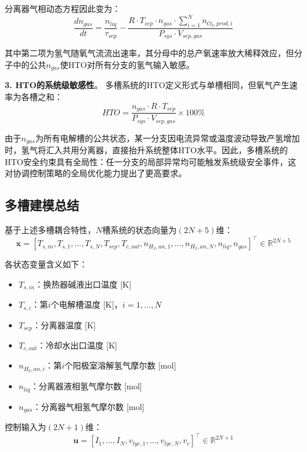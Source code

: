 分离器气相动态方程因此变为：
\begin{equation}
  \frac{dn_{gas}}{dt} = \frac{n_{liq}}{\tau_{sep}} - \frac{R \cdot T_{sep} \cdot n_{gas} \cdot \sum_{i=1}^{N} \dot{n}_{O_2,prod,i}}{P_{sys} \cdot V_{sep,gas}}
\end{equation}

其中第二项为氢气随氧气流流出速率，其分母中的总产氧速率放大稀释效应，但分子中的公共$n_{gas}$使HTO对所有分支的氢气输入敏感。

\textbf{3. HTO的系统级敏感性}。
多槽系统的HTO定义形式与单槽相同，但氧气产生速率为各槽之和：
\begin{equation}
  HTO = \frac{n_{gas} \cdot R \cdot T_{sep}}{P_{sys} \cdot V_{sep,gas}} \times 100\%
\end{equation}

由于$n_{gas}$为所有电解槽的公共状态，某一分支因电流异常或温度波动导致产氢增加时，氢气将汇入共用分离器，直接抬升系统整体HTO水平。因此，多槽系统的HTO安全约束具有全局性：任一分支的局部异常均可能触发系统级安全事件，这对协调控制策略的全局优化能力提出了更高要求。

\subsection{多槽建模总结}

基于上述多槽耦合特性，$N$槽系统的状态向量为$(2N+5)$维：
\begin{equation}
  \mathbf{x} = [T_{s,in}, T_{s,1}, \ldots, T_{s,N}, T_{sep}, T_{c,out}, n_{H_2,an,1}, \ldots, n_{H_2,an,N}, n_{liq}, n_{gas}]^\top \in \mathbb{R}^{2N+5}
\end{equation}

各状态变量含义如下：
\begin{itemize}
  \item $T_{s,in}$：换热器碱液出口温度 [K]
  \item $T_{s,i}$：第$i$个电解槽温度 [K]，$i=1,\ldots,N$
  \item $T_{sep}$：分离器温度 [K]
  \item $T_{c,out}$：冷却水出口温度 [K]
  \item $n_{H_2,an,i}$：第$i$个阳极室溶解氢气摩尔数 [mol]
  \item $n_{liq}$：分离器液相氢气摩尔数 [mol]
  \item $n_{gas}$：分离器气相氢气摩尔数 [mol]
\end{itemize}

控制输入为$(2N+1)$维：
\begin{equation}
  \mathbf{u} = [I_1, \ldots, I_N, v_{lye,1}, \ldots, v_{lye,N}, v_c]^\top \in \mathbb{R}^{2N+1}
\end{equation}

